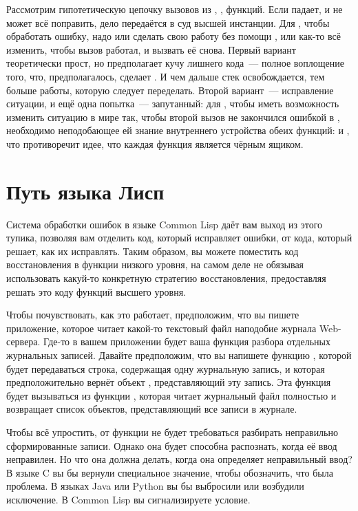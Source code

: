Рассмотрим гипотетическую цепочку вызовов из , , 
функций. Если  падает, и  не может всё поправить, дело
передаётся в суд высшей инстанции. Для , чтобы обработать ошибку, надо или
сделать свою работу без помощи , или как-то всё изменить, чтобы вызов
 работал, и вызвать её снова. Первый вариант теоретически прост, но
предполагает кучу лишнего кода~--- полное воплощение того, что, предполагалось, сделает
. И чем дальше стек освобождается, тем больше работы, которую следует
переделать. Второй вариант~--- исправление ситуации, и ещё одна попытка~--- запутанный:
для , чтобы иметь возможность изменить ситуацию в мире так, чтобы второй
вызов  не закончился ошибкой в , необходимо неподобающее ей
знание внутреннего устройства обеих функций:  и , что
противоречит идее, что каждая функция является чёрным ящиком.

\section{Путь языка Лисп}

Система обработки ошибок в языке Common Lisp даёт вам выход из этого тупика, позволяя вам
отделить код, который исправляет ошибки, от кода, который решает, как их исправлять. Таким
образом, вы можете поместить код восстановления в функции низкого уровня, на самом деле не
обязывая использовать какуй-то конкретную стратегию восстановления, предоставляя решать
это коду функций высшего уровня.

Чтобы почувствовать, как это работает, предположим, что вы пишете приложение, которое
читает какой-то текстовый файл наподобие журнала Web-сервера. Где-то в вашем приложении
будет ваша функция разбора отдельных журнальных записей. Давайте предположим, что вы
напишете функцию , которой будет передаваться строка, содержащая
одну журнальную запись, и которая предположительно вернёт объект ,
представляющий эту запись. Эта функция будет вызываться из функции ,
которая читает журнальный файл полностью и возвращает список объектов, представляющий все
записи в журнале.

Чтобы всё упростить, от функции  не будет требоваться разбирать
неправильно сформированные записи. Однако она будет способна распознать, когда её ввод
неправилен. Но что она должна делать, когда она определяет неправильный ввод? В языке C вы
бы вернули специальное значение, чтобы обозначить, что была проблема. В языках Java или
Python вы бы выбросили или возбудили исключение. В Common Lisp вы сигнализируете условие.


